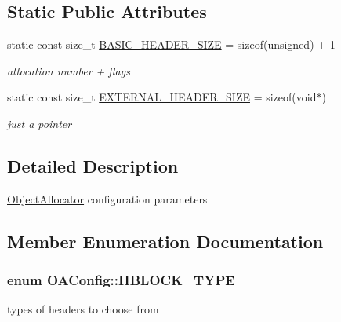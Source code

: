 \subsection*{Static Public Attributes}
\begin{DoxyCompactItemize}
\item 
\hypertarget{structOAConfig_a4474c8412a0fc66a4d990dcb6b544299}{static const size\-\_\-t \hyperlink{structOAConfig_a4474c8412a0fc66a4d990dcb6b544299}{B\-A\-S\-I\-C\-\_\-\-H\-E\-A\-D\-E\-R\-\_\-\-S\-I\-Z\-E} = sizeof(unsigned) + 1}\label{structOAConfig_a4474c8412a0fc66a4d990dcb6b544299}

\begin{DoxyCompactList}\small\item\em allocation number + flags \end{DoxyCompactList}\item 
\hypertarget{structOAConfig_a6da9f1d439103801855d9053107a6410}{static const size\-\_\-t \hyperlink{structOAConfig_a6da9f1d439103801855d9053107a6410}{E\-X\-T\-E\-R\-N\-A\-L\-\_\-\-H\-E\-A\-D\-E\-R\-\_\-\-S\-I\-Z\-E} = sizeof(void$\ast$)}\label{structOAConfig_a6da9f1d439103801855d9053107a6410}

\begin{DoxyCompactList}\small\item\em just a pointer \end{DoxyCompactList}\end{DoxyCompactItemize}


\subsection{Detailed Description}
\hyperlink{classObjectAllocator}{Object\-Allocator} configuration parameters 

\subsection{Member Enumeration Documentation}
\hypertarget{structOAConfig_a741c6dd161c0174180cc17f9a697b123}{
\subsubsection[{H\-B\-L\-O\-C\-K\-\_\-\-T\-Y\-P\-E}]{\setlength{\rightskip}{0pt plus 5cm}enum {\bf O\-A\-Config\-::\-H\-B\-L\-O\-C\-K\-\_\-\-T\-Y\-P\-E}}}\label{structOAConfig_a741c6dd161c0174180cc17f9a697b123}
types of headers to choose from 

